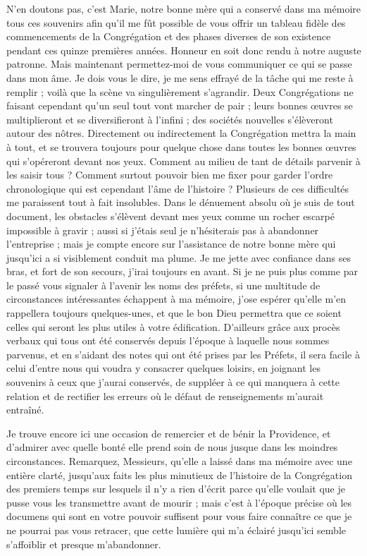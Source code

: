 N'en doutons pas, c'est Marie, notre bonne mère qui a conservé dans ma mémoire tous ces souvenirs afin qu'il me fût possible de vous offrir un tableau fidèle des commencements de la Congrégation et des phases diverses de son existence pendant ces quinze premières années. Honneur en soit donc rendu à notre auguste patronne. Mais maintenant permettez-moi de vous communiquer ce qui se passe dans mon âme. Je dois vous le dire, je me sens effrayé de la tâche qui me reste à remplir ; voilà que la scène va singulièrement s'agrandir. Deux Congrégations ne faisant cependant qu'un seul tout vont marcher de pair ; leurs bonnes œuvres se multiplieront et se diversifieront à l'infini ; des sociétés nouvelles s'élèveront autour des nôtres. Directement ou indirectement la Congrégation mettra la main à tout, et se trouvera toujours pour quelque chose dans toutes les bonnes œuvres qui s'opéreront devant nos yeux. Comment au milieu de tant de détails parvenir à les saisir tous ? Comment surtout pouvoir bien me fixer pour garder l'ordre chronologique qui est cependant l'âme de l'histoire ?
Plusieurs de ces difficultés me paraissent tout à fait insolubles. Dans le dénuement absolu où je suis de tout document, les obstacles s'élèvent devant mes yeux comme un rocher escarpé impossible à gravir ; aussi si j'étais seul je n'hésiterais pas à abandonner l'entreprise ; mais je compte encore sur l'assistance de notre bonne mère qui jusqu'ici a si visiblement conduit ma plume. Je me jette avec confiance dans ses bras, et fort de son secours, j'irai toujours en avant. Si je ne puis plus comme par le passé vous signaler à l'avenir les noms des préfets, si une multitude de circonstances intéressantes échappent à ma mémoire, j'ose espérer qu'elle m'en rappellera toujours quelques-unes, et que le bon Dieu permettra que ce soient celles qui seront les plus utiles à votre édification. D'ailleurs grâce aux procès verbaux qui tous ont été conservés depuis l'époque à laquelle nous sommes parvenus, et en s'aidant des notes qui ont été prises par les Préfets, il sera facile à celui d'entre nous qui voudra y consacrer quelques loisirs, en joignant les souvenirs à ceux que j'aurai conservés, de suppléer à ce qui manquera à cette relation et de rectifier les erreurs où le défaut de renseignements m'aurait entraîné.

Je trouve encore ici une occasion de remercier et de bénir la Providence, et d'admirer avec quelle bonté elle prend soin de nous jusque dans les moindres circonstances. Remarquez, Messieurs, qu'elle a laissé dans ma mémoire avec une entière clarté, jusqu'aux faits les plus minutieux de l'histoire de la Congrégation des premiers temps sur lesquels il n'y a rien d'écrit parce qu'elle voulait que je pusse vous les transmettre avant de mourir ; mais c'est à l'époque précise où les documens
qui sont en votre pouvoir suffisent pour vous faire connaître ce que je ne pourrai pas vous retracer, que cette lumière qui m'a éclairé jusqu'ici semble s'affoiblir et presque m'abandonner.

